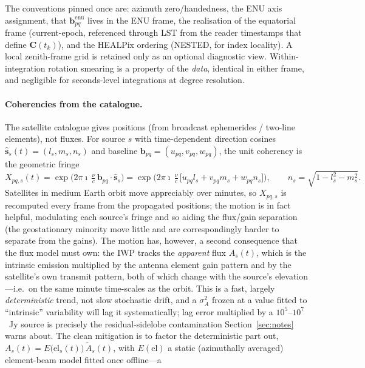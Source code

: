 \documentclass[11pt]{article}
\begin{document}
The conventions pinned once are: azimuth zero/handedness, the
ENU axis assignment, that $\bm{b}^{\mathrm{enu}}_{pq}$ lives in the ENU frame, the realisation of
the equatorial frame (current-epoch, referenced through LST from the reader timestamps that define
$\bm{C}(t_k)$), and the HEALPix ordering (NESTED, for index locality). A local zenith-frame grid is
retained only as an optional diagnostic view. Within-integration rotation smearing is a property of
the \emph{data}, identical in either frame, and negligible for seconds-level integrations at degree
resolution.

\paragraph{Coherencies from the catalogue.} The satellite catalogue gives positions (from broadcast
ephemerides / two-line elements), not fluxes. For source $s$ with time-dependent direction cosines
$\hat{\bm{s}}_s(t)=(l_s,m_s,n_s)$ and baseline $\bm{b}_{pq}=(u_{pq},v_{pq},w_{pq})$, the unit
coherency is the geometric fringe
\begin{equation}
  X_{pq,s}(t)=\exp\!\Big(2\pi\imath\,\tfrac{\nu}{c}\,\bm{b}_{pq}\cdot\hat{\bm{s}}_s\Big)
  =\exp\!\Big(2\pi\imath\,\tfrac{\nu}{c}\,\big[u_{pq}l_s+v_{pq}m_s+w_{pq}n_s\big]\Big),
  \qquad n_s=\sqrt{1-l_s^2-m_s^2}.
\end{equation}
Satellites in medium Earth orbit move appreciably over minutes, so $X_{pq,s}$ is recomputed every
frame from the propagated positions; the motion is in fact helpful, modulating each source's fringe
and so aiding the flux/gain separation (the geostationary minority move little and are
correspondingly harder to separate from the gains). The motion has, however, a second consequence
that the flux model must own: the IWP tracks the \emph{apparent} flux $A_s(t)$, which is the
intrinsic emission multiplied by the antenna element gain pattern and by the satellite's own
transmit pattern, both of which change with the source's elevation---i.e.\ on the same
minute time-scales as the orbit. This is a fast, largely \emph{deterministic} trend, not slow
stochastic drift, and a $\sigma_A^2$ frozen at a value fitted to ``intrinsic'' variability will lag
it systematically; lag error multiplied by a $10^5$--$10^7$~Jy source is precisely the
residual-sidelobe contamination Section~\ref{sec:notes} warns about. The clean mitigation is to
factor the deterministic part out, $A_s(t)=E\big(\mathrm{el}_s(t)\big)\,\tilde A_s(t)$, with
$E(\mathrm{el})$ a static (azimuthally averaged) element-beam model fitted once offline---a
\end{document}
